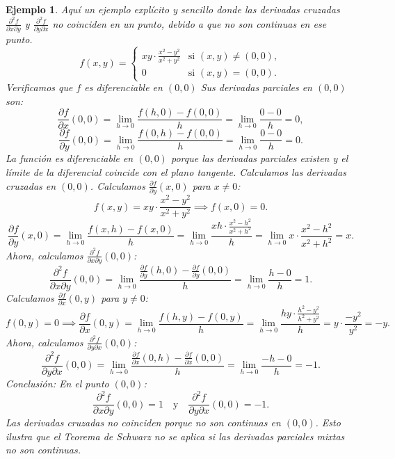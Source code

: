 \documentclass[11pt]{book}
\theoremstyle{definicion}
\theoremstyle{teorema}
\theoremstyle{ejemplo}
\newtheorem{ejemplo}{Ejemplo}[section]
\begin{document}
\begin{ejemplo}
    Aquí un ejemplo explícito y sencillo donde las derivadas cruzadas \( \frac{\partial^2 f}{\partial x \partial y} \) y \( \frac{\partial^2 f}{\partial y \partial x} \) no coinciden en un punto, debido a que no son continuas en ese punto.
\[
f(x, y) = \begin{cases}
xy \cdot \frac{x^2 - y^2}{x^2 + y^2} & \text{si } (x, y) \neq (0, 0), \\
0 & \text{si } (x, y) = (0, 0).
\end{cases}
\]
%
%
Verificamos que \( f \) es diferenciable en \( (0, 0) \)
Sus derivadas parciales en \( (0, 0) \) son:
  \[
  \frac{\partial f}{\partial x}(0, 0) = \lim_{h \to 0} \frac{f(h, 0) - f(0, 0)}{h} = \lim_{h \to 0} \frac{0 - 0}{h} = 0,
  \]
  \[
  \frac{\partial f}{\partial y}(0, 0) = \lim_{h \to 0} \frac{f(0, h) - f(0, 0)}{h} = \lim_{h \to 0} \frac{0 - 0}{h} = 0.
  \]
La función es diferenciable en \( (0, 0) \) porque las derivadas parciales existen y el límite de la diferencial coincide con el plano tangente.
Calculamos las derivadas cruzadas en \( (0, 0) \).
Calculamos \( \frac{\partial f}{\partial y}(x, 0) \) para \( x \neq 0 \):
   \[
   f(x, y) = xy \cdot \frac{x^2 - y^2}{x^2 + y^2} \implies f(x, 0) = 0.
   \]
   \[
   \frac{\partial f}{\partial y}(x, 0) = \lim_{h \to 0} \frac{f(x, h) - f(x, 0)}{h} = \lim_{h \to 0} \frac{xh \cdot \frac{x^2 - h^2}{x^2 + h^2}}{h} = \lim_{h \to 0} x \cdot \frac{x^2 - h^2}{x^2 + h^2} = x.
   \]
Ahora, calculamos \( \frac{\partial^2 f}{\partial x \partial y}(0, 0) \):
   \[
   \frac{\partial^2 f}{\partial x \partial y}(0, 0) = \lim_{h \to 0} \frac{\frac{\partial f}{\partial y}(h, 0) - \frac{\partial f}{\partial y}(0, 0)}{h} = \lim_{h \to 0} \frac{h - 0}{h} = 1.
   \]
Calculamos \( \frac{\partial f}{\partial x}(0, y) \) para \( y \neq 0 \):
   \[
   f(0, y) = 0 \implies \frac{\partial f}{\partial x}(0, y) = \lim_{h \to 0} \frac{f(h, y) - f(0, y)}{h} = \lim_{h \to 0} \frac{hy \cdot \frac{h^2 - y^2}{h^2 + y^2}}{h} = y \cdot \frac{-y^2}{y^2} = -y.
   \]
Ahora, calculamos \( \frac{\partial^2 f}{\partial y \partial x}(0, 0) \):
   \[
   \frac{\partial^2 f}{\partial y \partial x}(0, 0) = \lim_{h \to 0} \frac{\frac{\partial f}{\partial x}(0, h) - \frac{\partial f}{\partial x}(0, 0)}{h} = \lim_{h \to 0} \frac{-h - 0}{h} = -1.
   \]
%
%
Conclusión:
En el punto \( (0, 0) \):
\[
\frac{\partial^2 f}{\partial x \partial y}(0, 0) = 1 \quad \text{y} \quad \frac{\partial^2 f}{\partial y \partial x}(0, 0) = -1.
\]
Las derivadas cruzadas no coinciden porque no son continuas en \( (0, 0) \). Esto ilustra que el Teorema de Schwarz no se aplica si las derivadas parciales mixtas no son continuas.
\end{ejemplo}
\end{document}
